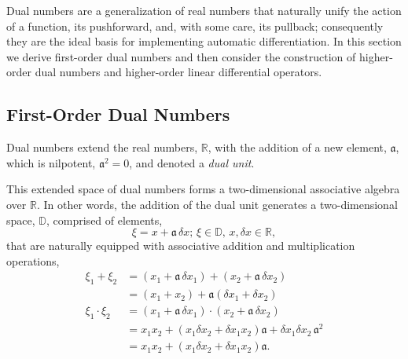 Dual numbers are a generalization of real numbers that naturally unify the
action of a function, its pushforward, and, with some care, its pullback;
consequently they are the ideal basis for implementing automatic differentiation. 
In this section we derive first-order dual numbers and then consider the construction 
of higher-order dual numbers and higher-order linear differential operators.

\subsection{First-Order Dual Numbers}

Dual numbers extend the real numbers, $\mathbb{R}$, with the
addition of a new element, $\mathfrak{a}$, which is nilpotent, $\mathfrak{a}^{2} = 0$,
and denoted a \textit{dual unit}.

This extended space of dual numbers forms a two-dimensional associative algebra 
over $\mathbb{R}$.  In other words, the addition of the dual unit generates a two-dimensional
space, $\mathbb{D}$, comprised of elements,
%
\begin{equation*}
\xi = x + \mathfrak{a} \, \delta x; \, \xi \in \mathbb{D}, \, x, \delta x \in \mathbb{R},
\end{equation*}
%
that are naturally equipped with associative addition and multiplication operations,
%
\begin{align*}
\xi_{1} + \xi_{2} 
&=
 \left( x_{1} + \mathfrak{a} \, \delta x_{1} \right) 
 + \left( x_{2} + \mathfrak{a} \,  \delta x_{2} \right) 
\\
&=
\left( x_{1} + x_{2} \right) 
+ \mathfrak{a} \left( \delta x_{1} + \delta x_{2} \right) 
\\
\xi_{1} \cdot \xi_{2} 
&= 
\left( x_{1} + \mathfrak{a} \, \delta x_{1} \right) 
\cdot \left( x_{2} + \mathfrak{a} \, \delta x_{2} \right) 
\\
&= 
x_{1} x_{2} + \left( x_{1} \delta x_{2} 
+ \delta x_{1} x_{2} \right) \mathfrak{a} 
+ \delta x_{1} \delta x_{2} \, \mathfrak{a}^{2} 
\\
&= 
x_{1} x_{2} + \left( x_{1} \delta x_{2} + \delta x_{1} x_{2} \right) \mathfrak{a}.
\end{align*}  

